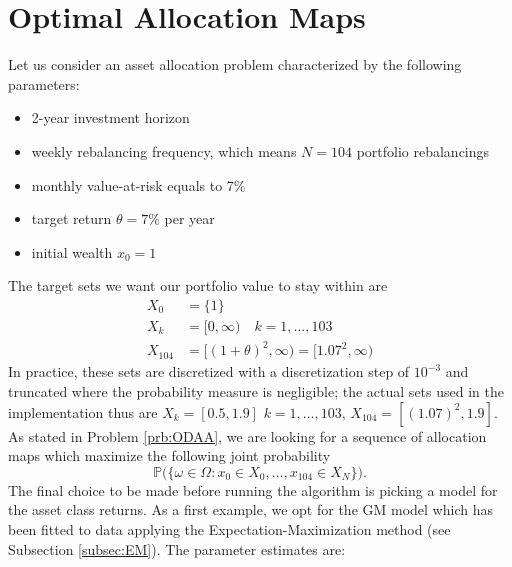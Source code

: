 \section{Optimal Allocation Maps}\label{sec:Allocation_Maps}
Let us consider an asset allocation problem characterized by the following parameters:
\begin{itemize}
	\item 2-year investment horizon
	\item weekly rebalancing frequency, which means $N=104$ portfolio rebalancings
	\item monthly value-at-risk equals to 7\%
	\item target return $\theta=7\%$ per year
	\item initial wealth $x_0 = 1$
\end{itemize}
The target sets we want our portfolio value to stay within are 
\begin{align*}
X_0 & = \{1\}\\
X_k & = [0,\infty) \quad k = 1,\ldots,103 \\
X_{104} & = [(1+\theta)^2,\infty) = [1.07^2,\infty)
\end{align*}
In practice, these sets are discretized with a discretization step of $10^{-3}$ and truncated where the probability measure is negligible; the actual sets used in the implementation thus are $X_k = [0.5,1.9]$ $k=1,\ldots,103$, $X_{104}=[(1.07)^2,1.9]$. As stated in Problem \ref{prb:ODAA}, we are looking for a sequence of allocation maps which maximize the following joint probability
\[ \mathbb{P}\big(\{\omega \in \Omega : x_0 \in X_0,\ldots,x_{104} \in X_N \} \big).\]
The final choice to be made before running the algorithm is picking a model for the asset class returns. As a first example, we opt for the GM model which has been fitted to data applying the Expectation-Maximization method (see Subsection \ref{subsec:EM}). The parameter estimates are:

